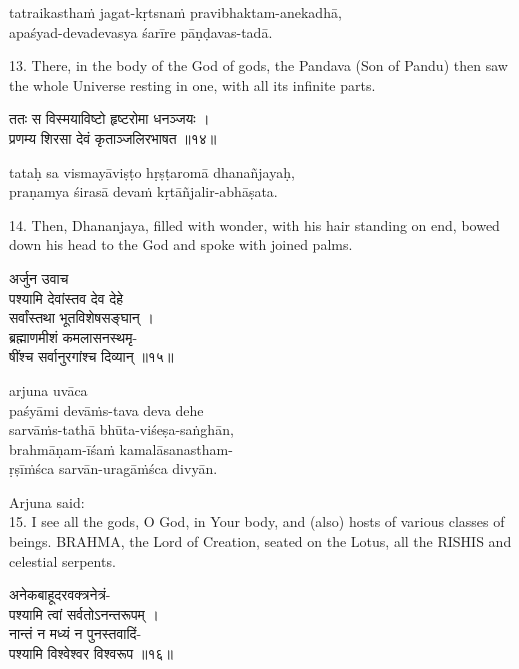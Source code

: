 \begin{transliteration}
tatraikasthaṁ jagat-kṛtsnaṁ pravibhaktam-anekadhā, \\
apaśyad-devadevasya śarīre pāṇḍavas-tadā.
\end{transliteration}

13. There, in the body of the God of gods, the Pandava (Son of Pandu) then saw
the whole Universe resting in one, with all its infinite parts.

\begin{gitaverse}
ततः स विस्मयाविष्टो हृष्टरोमा धनञ्जयः । \\
प्रणम्य शिरसा देवं कृताञ्जलिरभाषत ॥१४॥
\end{gitaverse}

\begin{transliteration}
tataḥ sa vismayāviṣṭo hṛṣṭaromā dhanañjayaḥ, \\
praṇamya śirasā devaṁ kṛtāñjalir-abhāṣata.
\end{transliteration}

14. Then, Dhananjaya, filled with wonder, with his hair standing on end, bowed
down his head to the God and spoke with joined palms.

\begin{gitaverse}
अर्जुन उवाच \\
पश्यामि देवांस्तव देव देहे \\
\tab सर्वांस्तथा भूतविशेषसङ्घान् । \\
ब्रह्माणमीशं कमलासनस्थमृ- \\
\tab षींश्च सर्वानुरगांश्च दिव्यान् ॥१५॥
\end{gitaverse}

\begin{transliteration}
arjuna uvāca \\
paśyāmi devāṁs-tava deva dehe \\
\tab sarvāṁs-tathā bhūta-viśeṣa-saṅghān, \\
brahmāṇam-īśaṁ kamalāsanastham- \\
\tab ṛṣīṁśca sarvān-uragāṁśca divyān.
\end{transliteration}

Arjuna said: \\
15. I see all the gods, O God, in Your body, and (also) hosts of various
classes of beings. BRAHMA, the Lord of Creation, seated on the Lotus, all the
RISHIS and celestial serpents.

\begin{gitaverse}
अनेकबाहूदरवक्त्रनेत्रं- \\
\tab पश्यामि त्वां सर्वतोऽनन्तरूपम् । \\
नान्तं न मध्यं न पुनस्तवादिं- \\
\tab पश्यामि विश्वेश्वर विश्वरूप ॥१६॥
\end{gitaverse}

